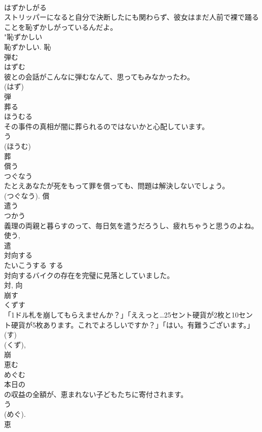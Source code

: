 \documentclass[8pt]{extreport}
\begin{document}
\begin{CJK}{UTF8}{min}
\\	はずかしがる	
\\	ストリッパーになると自分で決断したにも関わらず、彼女はまだ人前で裸で踊ることを恥ずかしがっているんだよ。	
\\	"恥ずかしい 
\\	恥ずかしい.	恥	
\\	弾む	
\\	はずむ	
\\	彼との会話がこんなに弾むなんて、思ってもみなかったわ。	
\\	(はず) 
\\	弾	
\\	葬る	
\\	ほうむる	
\\	その事件の真相が闇に葬られるのではないかと心配しています。	
\\	う 
\\	(ほうむ) 
\\	葬	
\\	償う	
\\	つぐなう	
\\	たとえあなたが死をもって罪を償っても、問題は解決しないでしょう。	
\\	(つぐなう).	償	
\\	遣う	
\\	つかう	
\\	義理の両親と暮らすのって、毎日気を遣うだろうし、疲れちゃうと思うのよね。	
\\	使う, 
\\	遣	
\\	対向する	
\\	たいこうする	する 
\\	対向するバイクの存在を完璧に見落としていました。	
\\	対, 向	
\\	崩す	
\\	くずす	
\\	「1ドル札を崩してもらえませんか？」「ええっと…25セント硬貨が2枚と10セント硬貨が5枚あります。これでよろしいですか？」「はい。有難うございます。」	
\\	(す) 
\\	(くず), 
\\	崩	
\\	恵む	
\\	めぐむ	
\\	本日の
\\	の収益の全額が、恵まれない子どもたちに寄付されます。	
\\	う 
\\	(めぐ). 
\\	恵	

\end{CJK}
\end{document}
